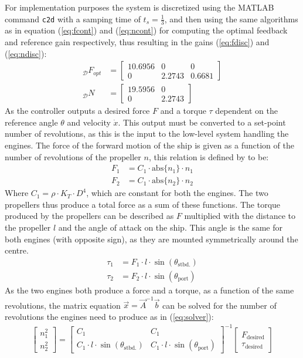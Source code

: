\documentclass{ifacconf}
\begin{document}
For implementation purposes the system is discretized using the MATLAB command \texttt{c2d} with a samping time of $t_s = \frac{1}{3}$, and then using the same algorithms as in equation (\ref{eq:fcont}) and (\ref{eq:ncont}) for computing the optimal feedback and reference gain respectively, thus resulting in the gains (\ref{eq:fdisc}) and (\ref{eq:ndisc}):
\begin{align}
_\mathcal{D}F_{opt} &= \begin{bmatrix}
10.6956 & 0 & 0\\
0 & 2.2743 & 0.6681
\end{bmatrix}\label{eq:fdisc}\\
_\mathcal{D}N &=  \begin{bmatrix}
19.5956 & 0\\
0 & 2.2743
\end{bmatrix}\label{eq:ndisc}
\end{align}
As the controller outputs a desired force $F$ and a torque $\tau$ dependent on the reference angle $\theta$ and velocity $\dot{x}$. This output must be converted to a set-point number of revolutions, as this is the input to the low-level system handling the engines. The force of the forward motion of the ship is given as a function of the number of revolutions of the propeller $n$, this relation is defined by \cite{cyber} to be:
\begin{align}
F_1 &= C_1 \cdot \text{abs}\{n_1\} \cdot n_1\\
F_2 &= C_1 \cdot \text{abs}\{n_2\} \cdot n_2
\end{align}
Where $C_1 = \rho \cdot K_T \cdot D^4$, which are constant for both the engines. The two propellers thus produce a total force as a sum of these functions. The torque produced by the propellers can be described as $F$ multiplied with the distance to the propeller $l$ and the angle of attack on the ship. This angle is the same for both engines (with opposite sign), as they are mounted symmetrically around the centre.
\begin{align}
\tau_1 &= F_1 \cdot l \cdot \sin(\theta_\text{stbd.})\\
\tau_2 &= F_2 \cdot l \cdot \sin(\theta_\text{port})
\end{align}
As the two engines both produce a force and a torque, as a function of the same revolutions, the matrix equation $\vec{x} = \vec{A}^{-1}\vec{b}$ can be solved for the number of revolutions the engines need to produce as in (\ref{eq:solver}):
\begin{align}
\begin{bmatrix}
n_1^2\\
n_2^2
\end{bmatrix} = \begin{bmatrix}
C_1 & C_1\\
C_1 \cdot l \cdot \sin(\theta_\text{stbd.}) & C_1 \cdot l \cdot \sin(\theta_\text{port})
\end{bmatrix}^{-1}\begin{bmatrix}
F_\text{desired}\\
\tau_\text{desired}
\end{bmatrix}\label{eq:solver}
\end{align}
\end{document}
